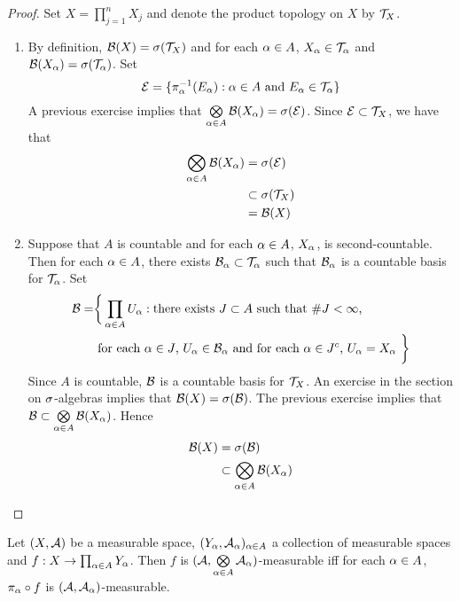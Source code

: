 \documentclass{book}
\begin{document}
 	\begin{proof} Set $X = \prod_{j=1}^n X_j$ and denote the product topology on $X$ by $\mathcal{T}_X$. 
 		\begin{enumerate}
 			\item By definition, $\mathcal{B}(X) = \sigma(\mathcal{T}_X)$ and for each $\alpha \in A$, $X_{\alpha} \in \mathcal{T}_{\alpha}$ and $\mathcal{B}(X_{\alpha}) = \sigma(\mathcal{T}_{\alpha})$. Set 
 			$$\mathcal{E} = \{\pi^{-1}_{\alpha}(E_{\alpha}): \alpha \in A \text{ and } E_{\alpha} \in \mathcal{T}_{\alpha} \}$$ 
 			A previous exercise implies that $\bigotimes\limits_{\alpha \in A} \mathcal{B}(X_{\alpha}) = \sigma(\mathcal{E})$. Since $\mathcal{E} \subset \mathcal{T}_X$, we have that
 			\begin{align*}
 				\bigotimes_{\alpha \in A} \mathcal{B}(X_{\alpha}) 
 				& = \sigma(\mathcal{E}) \\
 				& \subset \sigma(\mathcal{T}_X) \\
 				& = \mathcal{B}(X)
 			\end{align*}
 			\item Suppose that $A$ is countable and for each $\alpha \in A$, $X_{\alpha}$, is second-countable. Then for each $\alpha \in A$, there exists $\mathcal{B}_{\alpha} \subset \mathcal{T}_{\alpha}$ such that $\mathcal{B}_{\alpha}$ is a countable basis for $\mathcal{T}_{\alpha}$. Set 
 			\begin{align*}
 				\mathcal{B} = 
 				& \bigg \{\prod_{\alpha \in A} U_{\alpha}: \text{there exists $J \subset A$ such that $ \# J < \infty$, } \\
 				& \text{ for each $\alpha \in J$, $U_{\alpha} \in \mathcal{B}_{\alpha}$ and for each $\alpha \in J^c$, $U_{\alpha} = X_{\alpha}$ } \bigg \}
 			\end{align*} 
 			Since $A$ is countable, $\mathcal{B}$ is a countable basis for $\mathcal{T}_X$. An exercise in the section on $\sigma$-algebras implies that $\mathcal{B}(X) = \sigma(\mathcal{B})$. The previous exercise implies that $\mathcal{B} \subset \bigotimes\limits_{\alpha \in A} \mathcal{B}(X_{\alpha})$. Hence
 			\begin{align*}
 				\mathcal{B}(X) 
 				& = \sigma(\mathcal{B}) \\
 				& \subset \bigotimes_{\alpha \in A} \mathcal{B}(X_{\alpha}) 
 			\end{align*}
 		\end{enumerate}
 	\end{proof}
	
	\begin{ex} 
		Let $(X, \mathcal{A})$ be a measurable space, $(Y_{\alpha}, \mathcal{A}_{\alpha})_{\alpha \in A}$ a collection of measurable spaces and $f: X \rightarrow \prod_{\alpha \in A}Y_{\alpha}$. Then $f$ is $(\mathcal{A}, \bigotimes\limits_{\alpha \in A} \mathcal{A}_{\alpha})$-measurable iff for each $\alpha \in A$, $\pi_{\alpha} \circ f$ is $(\mathcal{A}, \mathcal{A}_{\alpha})$-measurable.
	\end{ex}
	
\end{document}
